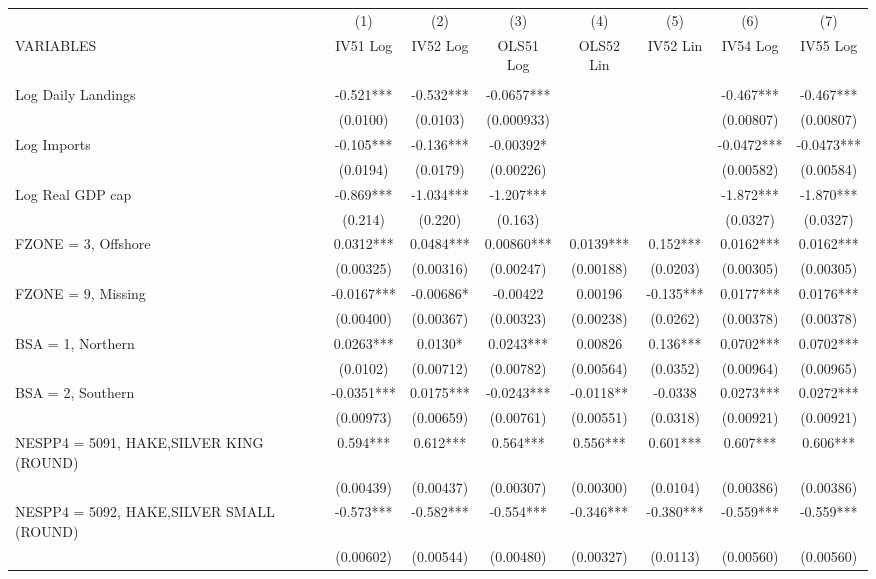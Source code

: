 \begin{tabular}{lccccccc} \hline
 & (1) & (2) & (3) & (4) & (5) & (6) & (7) \\
VARIABLES & IV51 Log & IV52 Log & OLS51 Log & OLS52 Lin & IV52 Lin & IV54 Log & IV55 Log \\ \hline
 &  &  &  &  &  &  &  \\
Log Daily Landings & -0.521*** & -0.532*** & -0.0657*** &  &  & -0.467*** & -0.467*** \\
 & (0.0100) & (0.0103) & (0.000933) &  &  & (0.00807) & (0.00807) \\
Log Imports & -0.105*** & -0.136*** & -0.00392* &  &  & -0.0472*** & -0.0473*** \\
 & (0.0194) & (0.0179) & (0.00226) &  &  & (0.00582) & (0.00584) \\
Log Real GDP cap & -0.869*** & -1.034*** & -1.207*** &  &  & -1.872*** & -1.870*** \\
 & (0.214) & (0.220) & (0.163) &  &  & (0.0327) & (0.0327) \\
FZONE = 3, Offshore & 0.0312*** & 0.0484*** & 0.00860*** & 0.0139*** & 0.152*** & 0.0162*** & 0.0162*** \\
 & (0.00325) & (0.00316) & (0.00247) & (0.00188) & (0.0203) & (0.00305) & (0.00305) \\
FZONE = 9, Missing & -0.0167*** & -0.00686* & -0.00422 & 0.00196 & -0.135*** & 0.0177*** & 0.0176*** \\
 & (0.00400) & (0.00367) & (0.00323) & (0.00238) & (0.0262) & (0.00378) & (0.00378) \\
BSA = 1, Northern & 0.0263*** & 0.0130* & 0.0243*** & 0.00826 & 0.136*** & 0.0702*** & 0.0702*** \\
 & (0.0102) & (0.00712) & (0.00782) & (0.00564) & (0.0352) & (0.00964) & (0.00965) \\
BSA = 2, Southern & -0.0351*** & 0.0175*** & -0.0243*** & -0.0118** & -0.0338 & 0.0273*** & 0.0272*** \\
 & (0.00973) & (0.00659) & (0.00761) & (0.00551) & (0.0318) & (0.00921) & (0.00921) \\
NESPP4 = 5091, HAKE,SILVER KING (ROUND) & 0.594*** & 0.612*** & 0.564*** & 0.556*** & 0.601*** & 0.607*** & 0.606*** \\
 & (0.00439) & (0.00437) & (0.00307) & (0.00300) & (0.0104) & (0.00386) & (0.00386) \\
NESPP4 = 5092, HAKE,SILVER SMALL (ROUND) & -0.573*** & -0.582*** & -0.554*** & -0.346*** & -0.380*** & -0.559*** & -0.559*** \\
 & (0.00602) & (0.00544) & (0.00480) & (0.00327) & (0.0113) & (0.00560) & (0.00560) \\

\end{tabular}
